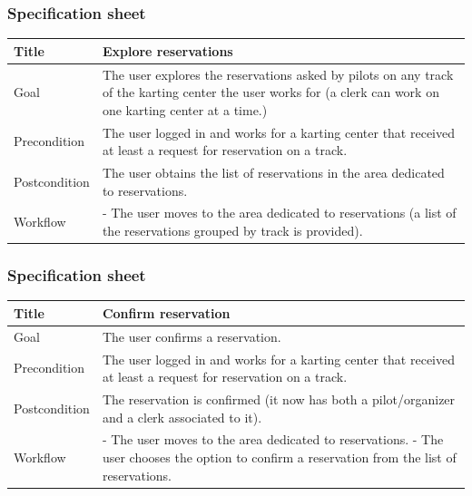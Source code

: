 \documentclass{beamer}
\begin{document}
\begin{frame}
    \frametitle{Specification sheet}
    \begin{table}
        \tiny
        \begin{tabular}{|p{2cm}|p{6cm}|}
        \hline  
        Title & \textbf{Explore reservations} \\
        \hline
        Goal & The user explores the reservations asked by pilots on any track of the karting
        center the user works for (a clerk can work on one karting center at a time.) \\
        \hline
        Precondition & The user logged in and works for a karting center
        that received at least a request for reservation on a track. \\
        \hline
        Postcondition & The user obtains the list of reservations in the area dedicated to reservations. \\
        \hline
        Workflow &
        - The user moves to the area dedicated to reservations (a list of the reservations grouped by 
        track is provided). \\
        \hline
        \end{tabular}
\end{table}
\end{frame}


\begin{frame}
    \frametitle{Specification sheet}
    \begin{table}
        \tiny
        \begin{tabular}{|p{2cm}|p{6cm}|}
        \hline  
        Title & \textbf{Confirm reservation} \\
        \hline
        Goal & The user confirms a reservation. \\
        \hline
        Precondition & The user logged in and works for a karting center that received
        at least a request for reservation on a track. \\
        \hline
        Postcondition & The reservation is confirmed (it now has both a pilot/organizer and a clerk associated
        to it). \\
        \hline
        Workflow &
        - The user moves to the area dedicated to reservations. \newline
        - The user chooses the option to confirm a reservation from the list of reservations. \\
        \hline
        \end{tabular}
\end{table}
\end{frame}
\end{document}
